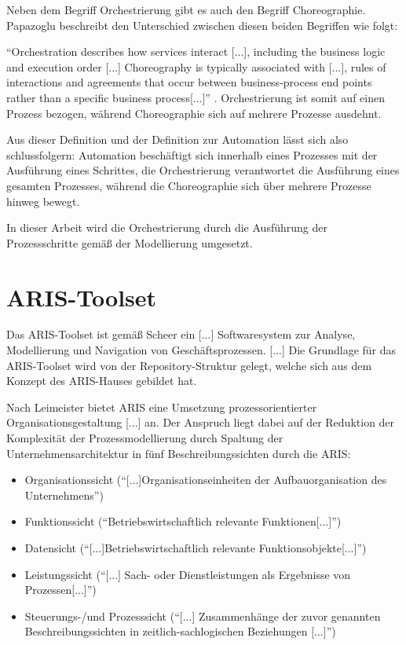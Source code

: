 \noindent Neben dem Begriff Orchestrierung gibt es auch den Begriff Choreographie. Papazoglu beschreibt den Unterschied zwischen diesen beiden Begriffen wie folgt:

\noindent ``Orchestration describes how services interact [...], including the business logic and execution order [...] Choreography is typically associated with [...], rules of interactions and agreements that occur between
business-process end points rather than a specific business process[...]'' \cite{papazoglou_service-oriented_2007}. Orchestrierung ist somit auf einen Prozess bezogen, während Choreographie
sich auf mehrere Prozesse ausdehnt.

\noindent Aus dieser Definition und der Definition zur Automation lässt sich also schlussfolgern: Automation beschäftigt sich innerhalb eines Prozesses mit der Ausführung eines Schrittes, die Orchestrierung verantwortet
die Ausführung eines gesamten Prozesses, während die Choreographie sich über mehrere Prozesse hinweg bewegt.

\noindent In dieser Arbeit wird die Orchestrierung durch die Ausführung der Prozessschritte gemäß der Modellierung umgesetzt. 

\section{ARIS-Toolset}
\label{aris-definition}

Das ARIS-Toolset ist gemäß Scheer ein [...] Softwaresystem zur Analyse, Modellierung und
Navigation von Geschäftsprozessen. [...] Die Grundlage für das ARIS-Toolset wird von der 
Repository-Struktur gelegt, welche sich aus dem Konzept des ARIS-Hauses gebildet hat. \cite{scheer_aris_1994} \cite{rump_geschaftsprozesmanagement_1999}

\noindent Nach Leimeister bietet ARIS eine Umsetzung prozessorientierter Organisationsgestaltung [...] an. Der Anspruch liegt dabei auf der 
Reduktion der Komplexität der Prozessmodellierung durch Spaltung der Unternehmensarchitektur in fünf 
Beschreibungssichten durch die \ac{ARIS}: \cite{leimeister_einfuhrung_2015}

\begin{itemize}
    \item Organisationssicht (``[...]Organisationseinheiten der Aufbauorganisation des Unternehmens'')\cite{leimeister_einfuhrung_2015}
    \item Funktionssicht (``Betriebswirtschaftlich relevante Funktionen[...]'')\cite{leimeister_einfuhrung_2015}
    \item Datensicht (``[...]Betriebswirtschaftlich relevante Funktionsobjekte[...]'')\cite{leimeister_einfuhrung_2015}
    \item Leistungssicht (``[...] Sach- oder Dienstleistungen als Ergebnisse von Prozessen[...]'')\cite{leimeister_einfuhrung_2015}
    \item Steuerungs-/und Prozesssicht (``[...] Zusammenhänge der zuvor genannten Beschreibungssichten in zeitlich-sachlogischen Beziehungen [...]'') \cite{leimeister_einfuhrung_2015}
\end{itemize} \cite{rump_geschaftsprozesmanagement_1999}


